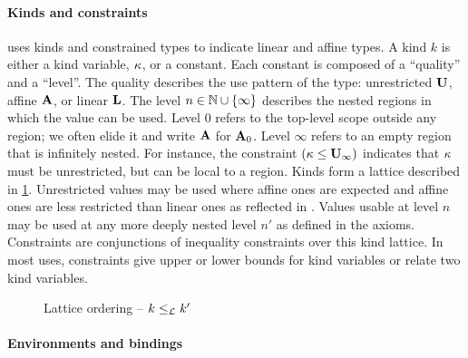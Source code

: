 \paragraph{Kinds and constraints}

\affe uses kinds and constrained types to indicate
linear and affine types.
A kind $k$ is either a kind variable, $\kappa$, or a constant.
Each constant is composed of a ``quality'' and a ``level''.
The quality describes the use pattern of the type:
unrestricted $\mathbf{U}$, affine $\mathbf{A}$, or linear $\mathbf{L}$. The level  $n \in \mathbb{N} \cup \{\infty\}$
describes the nested regions in which the value can be used.
Level $0$ refers to the top-level scope outside any region; we often elide it
and write $\mathbf{A}$ for $\mathbf{A}_0$. Level
$\infty$ refers to an empty region that is infinitely nested.
For instance, the constraint $(\kappa \leq \mathbf{U}_\infty)$ indicates that
$\kappa$ must be unrestricted, but can be local to a region.
%
Kinds form a lattice described in \cref{sdtyp:lattice}.
Unrestricted values may be used
where affine ones are expected and affine ones are less restricted
than linear ones as reflected in .
Values usable at level $n$ may be used at any more deeply
nested level $n'$ as defined in the  axioms.
%
Constraints are conjunctions of inequality constraints over this kind
lattice. In most uses, constraints give upper or lower bounds for
kind variables or relate two kind variables.

\begin{figure}[tp]
  
  \vspace{-5pt}
  \caption{Lattice ordering -- $k \leq_\mathcal L k'$}
  \label{sdtyp:lattice}
  \vspace{-10pt}
\end{figure}

\paragraph{Environments and bindings}
\label{sdtyping:envs}

